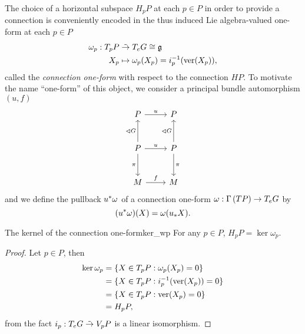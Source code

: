 The choice of a horizontal subspace \(H_pP\) at each \(p \in P\) in order to provide a connection is conveniently encoded in the thus induced Lie algebra-valued one-form at each \(p \in P\)
\begin{align*}
    \omega_p : T_pP &\mathrel{\tilde{\to}} T_eG \cong \mathfrak{g}\\
    X_p &\mapsto \omega_p(X_p) = i_p^{-1}(\operatorname{ver}(X_p)),
\end{align*}
called the \emph{connection one-form} with respect to the connection \(HP\). To motivate the name \enquote{one-form} of this object, we consider a principal bundle automorphism \((u,f)\)
\begin{equation*}
    \begin{tikzcd}[column sep = normal, row sep = large]
        P \arrow{r}{u} & P\\
        P \arrow[swap]{d}{\pi}\arrow{u}{\ract G} \arrow{r}{u} & P \arrow{u}{\ract G} \arrow{d}{\pi}\\
        M \arrow{r}{f} & M
    \end{tikzcd}
\end{equation*}
and we define the pullback \({u}^{\ast}_{}{\omega}\) of a connection one-form \(\omega : \Gamma\left(TP\right) \to T_eG\) by
\begin{equation*}
    ({u}^{\ast}_{}{\omega})(X) = \omega({u}_{\ast{}}{X}).
\end{equation*}

\begin{proposition}{The kernel of the connection one-form}{ker_wp}
    For any \(p \in P\), \(H_pP = \ker\omega_p\).
\end{proposition}
\begin{proof}
    Let \(p \in P\), then
    \begin{align*}
        \ker\omega_p &= \{X \in T_pP : \omega_p(X_p) = 0\}\\
                       &= \{X \in T_pP : i_p^{-1}(\operatorname{ver}(X_p)) = 0\}\\
                       &= \{X \in T_pP : \operatorname{ver}(X_p) = 0\}\\
                       &= H_pP,
    \end{align*}
    from the fact \(i_p : T_eG \mathrel{\tilde{\to}} V_pP\) is a linear isomorphism.
\end{proof}

